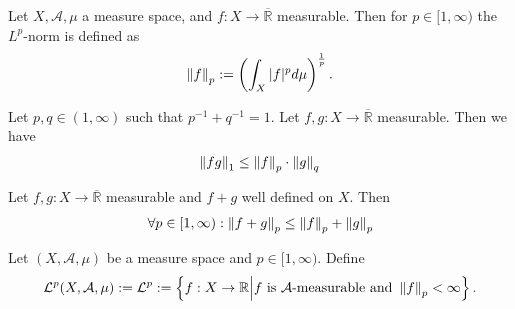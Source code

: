\begin{definition}[\(L^p\)-Norm]
    Let \(X, \mathcal{A}, \mu\) a measure space, and \(f: X \rightarrow \overline{\mathbb{R}}\) measurable. Then for \(p \in [1, \infty)\) the \(L^p\)-norm is defined as
    \begin{align}
        \left\lVert f\right\rVert_p := \left( \int_X |f|^p d\mu \right)^{\frac{1}{p}} \text{.}
    \end{align}
\end{definition}

\begin{theorem}
    Let \(p, q \in (1, \infty)\) such that \(p^{-1} + q^{-1} =1\). Let \(f, g: X \rightarrow \overline{\mathbb{R}}\) measurable. Then we have
    \begin{align}
        \left\lVert fg\right\rVert_1 \leq \left\lVert f\right\rVert_p \cdot \left\lVert g\right\rVert_q
    \end{align}
\end{theorem}

\begin{theorem}
    Let \(f, g: X \rightarrow \overline{\mathbb{R}}\) measurable and \(f + g\) well defined on \(X\). Then
    \begin{align}
        \forall p \in [1, \infty) : \left\lVert f + g\right\rVert_p \leq \left\lVert f\right\rVert_p + \left\lVert g\right\rVert_p
    \end{align}
\end{theorem}

\begin{definition}
    Let \( (X, \mathcal{A}, \mu) \) be a measure space and \(p \in [1, \infty)\). Define
    \begin{align}
        \mathcal{L}^p(X, \mathcal{A}, \mu) := \mathcal{L}^p := \left\{f: X \rightarrow \mathbb{R} \middle| f \text{ is \(\mathcal{A}\)-measurable and } \left\lVert f\right\rVert_p < \infty \right\} \text{.}
    \end{align}
\end{definition}

